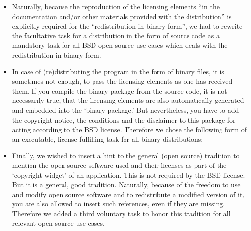 \begin{itemize}
\begin{quote}\textit{}\end{quote}

\item Naturally, because the reproduction of the licensing elements \enquote{in
  the documentation and/or other materials provided with the distribution} is
  explicitly required for the \enquote{redistribution in binary form},%
  \citeBSDsimple{} 
  we had to rewrite the facultative task for a distribution in the form of
  source code as a mandatory task for all BSD open source use cases which deals
  with the redistribution in binary form.

\item In case of (re)distributing the program in the form of binary files, it is
  sometimes not enough, to pass the licensing elements as one has received them.
  If you compile the binary package from the source code, it is not necessarily
  true, that the licensing elements are also automatically generated and
  embedded into the `binary package.' But nevertheless, you have to add the
  copyright notice, the conditions and the disclaimer to this package for acting
  according to the BSD license. Therefore we chose the following form of an
  executable, license fulfilling task for all binary distributions:

\begin{quote}\textit{\insertLicenseIntoBinary}\end{quote}

\item Finally, we wished to insert a hint to the general (open source) tradition
  to mention the open source software used and their licenses as part of the
  `copyright widget' of an application. This is not required by the BSD
  license. But it is a general, good tradition. Naturally, because of the
  freedom to use and modify open source software and to redistribute a modified
  version of it, you are also allowed to insert such references, even if they
  are missing. Therefore we added a third voluntary task to honor this tradition
  for all relevant open source use cases.

\end{itemize}


%

